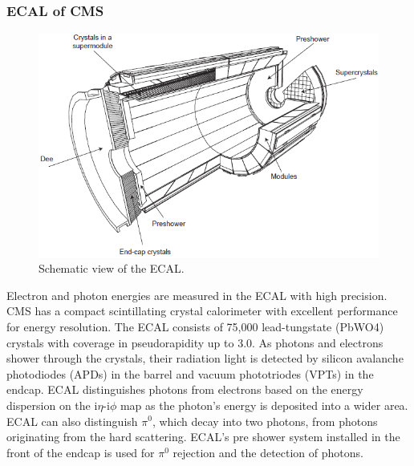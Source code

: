 \subsubsection{ECAL of CMS}
\begin{figure}[h!]
  \caption{Schematic view of the ECAL. \cite{ecal}}
  \label{fig:ECAL}
  \centering
  \includegraphics[width=0.87\linewidth]{figs/ECAL.png}
\end{figure}
Electron and photon energies are measured in the ECAL with high precision. 
CMS has a compact scintillating crystal calorimeter with excellent performance for energy resolution. 
The ECAL consists of 75,000 lead-tungstate (PbWO4) crystals with coverage in pseudorapidity up to 3.0. As photons and electrons shower through the crystals, their radiation light is detected by silicon avalanche photodiodes (APDs) in the barrel and vacuum phototriodes (VPTs) in the endcap.
ECAL distinguishes photons from electrons based on the energy dispersion on the i$\eta$-i$\phi$ map as the photon's energy is deposited into a wider area.
ECAL can also distinguish $\pi^{0}$, which decay into two photons, from photons originating from the hard scattering.
ECAL's pre shower system installed in the front of the endcap is used for $\pi^{0}$ rejection and the detection of photons.

